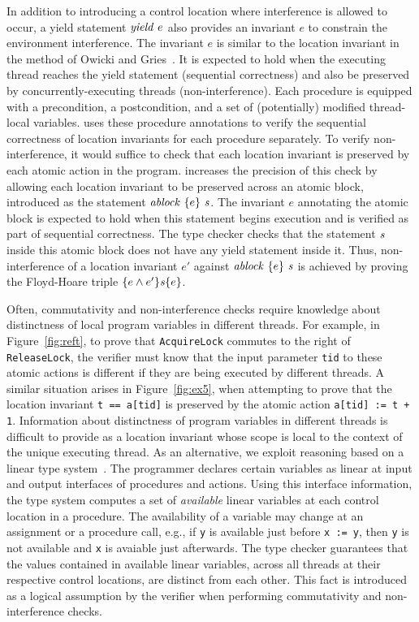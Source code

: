 In addition to introducing a control location where interference is allowed to occur, 
a yield statement $\mathit{yield}\ e$ also provides an invariant $e$ 
to constrain the environment interference.
The invariant $e$ is similar to the location invariant in the method of Owicki and Gries~\cite{OwickiG76}.
It is expected to hold when the executing thread reaches the yield statement (sequential correctness) 
and also be preserved by concurrently-executing threads (non-interference).
Each procedure is equipped with a precondition, a postcondition,
and a set of (potentially) modified thread-local variables.
\civl uses these procedure annotations to verify the sequential correctness of location invariants for each
procedure separately.
To verify non-interference, it would suffice to check that each location invariant is preserved by each atomic action in the program.
\civl increases the precision of this check by allowing each location invariant to be preserved across 
an atomic block, introduced as the statement $\mathit{ablock}\ {\{e\}}\ {\mathit{s}}$.
The invariant $e$ annotating the atomic block is expected to hold when this statement begins execution and is verified as part of sequential correctness.
The \civl type checker checks that the statement $\mathit{s}$ inside this atomic block does not have any yield statement inside it.
Thus, non-interference of a location invariant $e'$ against $\mathit{ablock}\ {\{e\}}\ {\mathit{s}}$ is achieved by proving the Floyd-Hoare triple $\{e \wedge e'\}\mathit{s}\{e\}$.

Often, commutativity and non-interference checks require knowledge about distinctness of local program variables in different threads.
For example, in Figure~\ref{fig:reft}, to prove that {\tt AcquireLock} commutes to the right of {\tt ReleaseLock}, the verifier must know
that the input parameter {\tt tid} to these atomic actions is different if they are being executed by different threads.
A similar situation arises in Figure~\ref{fig:ex5}, when attempting to prove that the location invariant {\tt t == a[tid]} is preserved by the atomic 
action {\tt a[tid] := t + 1}. 
Information about distinctness of program variables in different threads is difficult to provide as a location invariant 
whose scope is local to the context of the unique executing thread.
As an alternative, we exploit reasoning based on a linear type system~\cite{Wadler90lineartypes}.
The programmer declares certain variables as linear at input and output interfaces of procedures and actions.
Using this interface information, the \civl type system computes a set of {\em available\/} linear variables at each control location 
in a procedure.
The availability of a variable may change at an assignment or a procedure call, e.g., 
if {\tt y} is available just before {\tt x := y}, then {\tt y} is not available and {\tt x} is avaiable just afterwards.
The \civl type checker guarantees that the values contained in available linear variables, across all threads at their respective control locations, are 
distinct from each other.
This fact is introduced as a logical assumption by the verifier when performing commutativity and non-interference checks.

